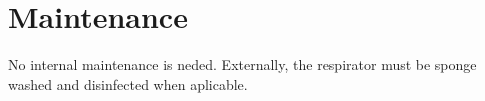 \section{Maintenance}
    No internal maintenance is neded. Externally, the respirator must be sponge washed and disinfected when aplicable.

